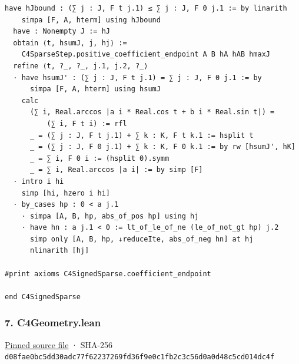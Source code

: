 \documentclass[11pt,a4paper]{article}
\begin{document}
\begin{Verbatim}[breaklines,breakanywhere,fontsize=\footnotesize]
    have hJbound : (∑ j : J, F t j.1) ≤ ∑ j : J, F 0 j.1 := by linarith
    simpa [F, A, hterm] using hJbound
  have : Nonempty J := hJ
  obtain ⟨t, hsumJ, j, hj⟩ :=
    C4SparseStep.positive_coefficient_endpoint A B hA hAB hmaxJ
  refine ⟨t, ?_, ?_, j.1, j.2, ?_⟩
  · have hsumJ' : (∑ j : J, F t j.1) = ∑ j : J, F 0 j.1 := by
      simpa [F, A, hterm] using hsumJ
    calc
      (∑ i, Real.arccos |a i * Real.cos t + b i * Real.sin t|) =
          (∑ i, F t i) := rfl
      _ = (∑ j : J, F t j.1) + ∑ k : K, F t k.1 := hsplit t
      _ = (∑ j : J, F 0 j.1) + ∑ k : K, F 0 k.1 := by rw [hsumJ', hK]
      _ = ∑ i, F 0 i := (hsplit 0).symm
      _ = ∑ i, Real.arccos |a i| := by simp [F]
  · intro i hi
    simp [hi, hzero i hi]
  · by_cases hp : 0 < a j.1
    · simpa [A, B, hp, abs_of_pos hp] using hj
    · have hn : a j.1 < 0 := lt_of_le_of_ne (le_of_not_gt hp) j.2
      simp only [A, B, hp, ↓reduceIte, abs_of_neg hn] at hj
      nlinarith [hj]

#print axioms C4SignedSparse.coefficient_endpoint

end C4SignedSparse
\end{Verbatim}

\subsubsection{7. C4Geometry.lean}\label{c4geometry.lean}

\href{https://github.com/mpelteshki/climbing-to-the-frontier/blob/29fbb70da18564048f62492e43870f2f96a65463/cagent/p1/C4Geometry.lean}{Pinned source file} · SHA-256 \texttt{d08fae0b\allowbreak{}c5dd30ad\allowbreak{}c77f6223\allowbreak{}7269fd36\allowbreak{}f9e0c1fb\allowbreak{}2c3c56d0\allowbreak{}a0d48c5c\allowbreak{}d014dc4f}
\end{document}
